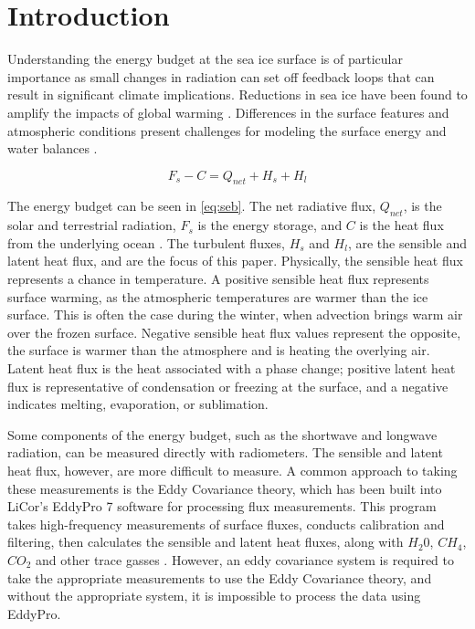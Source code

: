 \doublespacing
\section{Introduction}

Understanding the energy budget at the sea ice surface is of particular importance as small changes in radiation can set off feedback loops that can result in significant climate implications. Reductions in sea ice have been found to amplify the impacts of global warming \cite{wunderling:2020} \cite{ipcc_techsum}. Differences in the surface features and atmospheric conditions present challenges for modeling the surface energy and water balances \cite{wang:2009}. 

\begin{equation}\label{eq:seb}
F_{s} - C = Q_{net} + H_{s} + H_{l}
\end{equation}

The energy budget can be seen in \ref{eq:seb}. The net radiative flux, $Q_{net}$, is the solar and terrestrial radiation, $F_{s}$ is the energy storage, and $C$ is the heat flux from the underlying ocean \cite{walden:2017}. The turbulent fluxes, $H_{s}$ and $H_{l}$, are the sensible and latent heat flux, and are the focus of this paper. Physically, the sensible heat flux represents a chance in temperature. A positive sensible heat flux represents surface warming, as the atmospheric temperatures are warmer than the ice surface. This is often the case during the winter, when advection brings warm air over the frozen surface. Negative sensible heat flux values represent the opposite, the surface is warmer than the atmosphere and is heating the overlying air. Latent heat flux is the heat associated with a phase change; positive latent heat flux is representative of condensation or freezing at the surface, and a negative indicates melting, evaporation, or sublimation.

Some components of the energy budget, such as the shortwave and longwave radiation, can be measured directly with radiometers. The sensible and latent heat flux, however, are more difficult to measure. A common approach to taking these measurements is the Eddy Covariance theory, which has been built into LiCor's EddyPro 7 \cite{epro} software for processing flux measurements. This program takes high-frequency measurements of surface fluxes, conducts calibration and filtering, then calculates the sensible and latent heat fluxes, along with $H_{2}0$, $CH_{4}$, $CO_{2}$ and other trace gasses \cite{epro_man}. However, an eddy covariance system is required to take the appropriate measurements to use the Eddy Covariance theory, and without the appropriate system, it is impossible to process the data using EddyPro. 


